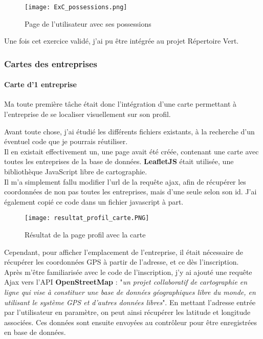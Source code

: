 \begin{figure}[H]
    \centering
    \texttt{[image: ExC\_possessions.png]}
    \caption{Page de l'utilisateur avec ses possessions}
\end{figure}

Une fois cet exercice validé, j'ai pu être intégrée au projet Répertoire Vert.


\subsubsection{Cartes des entreprises}

\label{carte}

\paragraph{Carte d'1 entreprise}
Ma toute première tâche était donc l'intégration d'une carte permettant à l'entreprise de se localiser visuellement sur son profil.

Avant toute chose, j'ai étudié les différents fichiers existants, à la recherche d'un éventuel code que je pourrais réutiliser.
\\Il en existait effectivement un, une page avait été créée, contenant une carte avec toutes les entreprises de la base de données. \textbf{LeafletJS} était utilisée, une bibliothèque JavaScript libre de cartographie.
\\Il m'a simplement fallu modifier l'url de la requête ajax, afin de récupérer les coordonnées de non pas toutes les entreprises, mais d'une seule selon son id. J'ai également copié ce code dans un fichier javascript à part.

\begin{figure}[H]
    \centering
    \texttt{[image: resultat\_profil\_carte.PNG]}
    \caption{Résultat de la page profil avec la carte}
\end{figure}

Cependant, pour afficher l'emplacement de l'entreprise, il était nécessaire de récupérer les coordonnées GPS à partir de l'adresse, et ce dès l'inscription.\\
Après m'être familiarisée avec le code de l'inscription, j'y ai ajouté une requête Ajax vers l'API \textbf{OpenStreetMap} : "\emph{un projet collaboratif de cartographie en ligne qui vise à constituer une base de données géographiques libre du monde, en utilisant le système GPS et d'autres données libres}".
En mettant l'adresse entrée par l'utilisateur en paramètre, on peut ainsi récupérer les latitude et longitude associées. Ces données sont ensuite envoyées au contrôleur pour être enregistrées en base de données.

